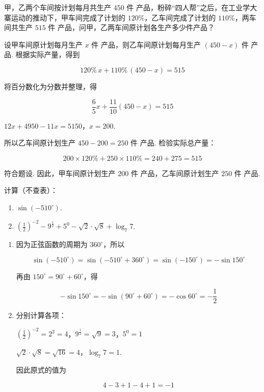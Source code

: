 \begin{problem}
甲，乙两个车间按计划每月共生产 \(450\text{ 件}\) 产品，粉碎“四人帮”之后，在工业学大寨运动的推动下，甲车间完成了计划的 \(120\%\)，乙车间完成了计划的 \(110\%\)，两车间共生产 \(515\text{ 件}\) 产品，问甲，乙两车间原计划各生产多少件产品？
\end{problem}

\begin{solution}
设甲车间原计划每月生产 \(x\text{ 件}\) 产品，则乙车间原计划每月生产 \(\left(450-x\right)\text{ 件}\) 产品. 根据实际产量，得到

\[
120\%\,x+110\%\,\left(450-x\right)=515
\]

将百分数化为分数并整理，得

\[
\frac{6}{5}x+\frac{11}{10}\left(450-x\right)=515
\]

\(12x+4950-11x=5150\)，\(x=200\).

所以乙车间原计划生产 \(450-200=250\text{ 件}\) 产品. 检验实际总产量：

\[
200\times120\%+250\times110\%=240+275=515
\]

符合题设. 因此，甲车间原计划生产 \(200\text{ 件}\) 产品，乙车间原计划生产 \(250\text{ 件}\) 产品.
\end{solution}

\begin{problem}
计算（不查表）：
\begin{enumerate}
    \item \(\sin(-510^\circ)\).
    \item \(\left(\frac{1}{2}\right)^{-2}-9^{\frac{1}{2}}+5^0-\sqrt2\cdot\sqrt8+\log_{7}7\).
\end{enumerate}
\end{problem}

\begin{solution}
\begin{enumerate}
    \item 因为正弦函数的周期为 \(360^\circ\)，所以

    \[
    \sin(-510^\circ)=\sin(-510^\circ+360^\circ)=\sin(-150^\circ)=-\sin150^\circ
    \]

    再由 \(150^\circ=90^\circ+60^\circ\)，得

    \[
    -\sin150^\circ=-\sin\left(90^\circ+60^\circ\right)=-\cos60^\circ=-\frac{1}{2}
    \]

    \item 分别计算各项：

\(\left(\frac{1}{2}\right)^{-2}=2^2=4\)，\(9^{\frac{1}{2}}=\sqrt9=3\)，\(5^0=1\)

\(\sqrt2\cdot\sqrt8=\sqrt{16}=4\)，\(\log_{7}7=1\).

    因此原式的值为

    \[
    4-3+1-4+1=-1
    \]
\end{enumerate}
\end{solution}

